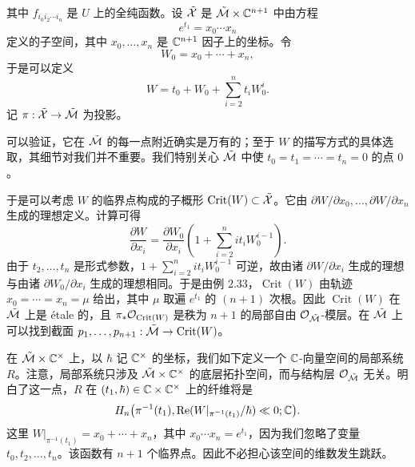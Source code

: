
其中 $f_{i_0i_2\cdots i_n}$ 是 $U$ 上的全纯函数。设 $\tilde{\mathcal{X}}$ 是 $\tilde{\mathcal{M}}\times\mathbb{C}^{n+1}$ 中由方程
\[
  e^{t_1}=x_0\cdots x_n
\]
定义的子空间，其中 $x_0,\ldots,x_n$ 是 $\mathbb{C}^{n+1}$ 因子上的坐标。令
\[
  W_0=x_0+\cdots+x_n,
\]
于是可以定义
\begin{equation}
  W=t_0+W_0+\sum_{i=2}^{n}t_iW_0^{i}. \tag{2.29}
\end{equation}
记 $\pi:\tilde{\mathcal{X}}\to\tilde{\mathcal{M}}$ 为投影。

可以验证，它在 $\tilde{\mathcal{M}}$ 的每一点附近确实是万有的；至于 $W$ 的描写方式的具体选取，其细节对我们并不重要。我们特别关心 $\tilde{\mathcal{M}}$ 中使 $t_0=t_1=\cdots=t_n=0$ 的点 $0$。

于是可以考虑 $W$ 的临界点构成的子概形 $\operatorname{Crit}(W)\subset\tilde{\mathcal{X}}$。它由 $\partial W/\partial x_0,\ldots,\partial W/\partial x_n$ 生成的理想定义。计算可得
\[
  \frac{\partial W}{\partial x_i}
  =\frac{\partial W_0}{\partial x_i}\left(1+\sum_{i=2}^{n}it_iW_0^{i-1}\right).
\]
由于 $t_2,\ldots,t_n$ 是形式参数，$1+\sum_{i=2}^{n}it_iW_0^{i-1}$ 可逆，故由诸 $\partial W/\partial x_i$ 生成的理想与由诸 $\partial W_0/\partial x_i$ 生成的理想相同。于是由例 2.33，$\operatorname{Crit}(W)$ 由轨迹 $x_0=\cdots=x_n=\mu$ 给出，其中 $\mu$ 取遍 $e^{t_1}$ 的 $(n+1)$ 次根。因此 $\operatorname{Crit}(W)$ 在 $\tilde{\mathcal{M}}$ 上是 étale 的，且 $\pi_*\mathcal{O}_{\operatorname{Crit}(W)}$ 是秩为 $n+1$ 的局部自由 $\mathcal{O}_{\tilde{\mathcal{M}}}$-模层。在 $\tilde{\mathcal{M}}$ 上可以找到截面 $p_1,\ldots,p_{n+1}:\tilde{\mathcal{M}}\to\operatorname{Crit}(W)$。


在 $\tilde{\mathcal{M}}\times\mathbb{C}^\times$ 上，以 $\hbar$ 记 $\mathbb{C}^\times$ 的坐标，我们如下定义一个 $\mathbb{C}$-向量空间的局部系统 $R$。注意，局部系统只涉及 $\tilde{\mathcal{M}}\times\mathbb{C}^\times$ 的底层拓扑空间，而与结构层 $\mathcal{O}_{\tilde{\mathcal{M}}}$ 无关。明白了这一点，$R$ 在 $(t_1,\hbar)\in\mathbb{C}\times\mathbb{C}^\times$ 上的纤维将是
\[
  H_n\bigl(\pi^{-1}(t_1),\operatorname{Re}(W|_{\pi^{-1}(t_1)}/\hbar)\ll0;\mathbb{C}\bigr).
\]
这里 $W|_{\pi^{-1}(t_1)}=x_0+\cdots+x_n$，其中 $x_0\cdots x_n=e^{t_1}$，因为我们忽略了变量 $t_0,t_2,\ldots,t_n$。该函数有 $n+1$ 个临界点。因此不必担心该空间的维数发生跳跃。

